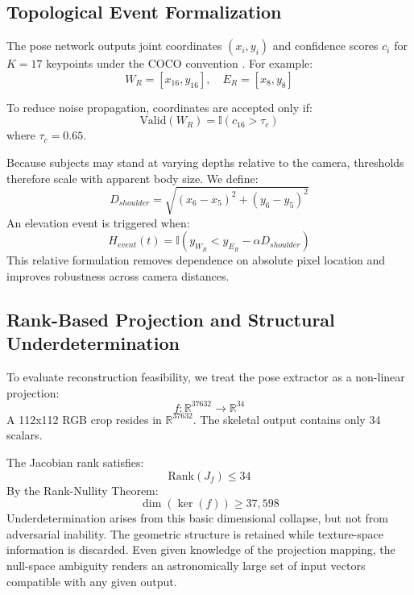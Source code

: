 \documentclass[conference]{IEEEtran}
\begin{document}
\subsection{Topological Event Formalization}
The pose network outputs joint coordinates $(x_i, y_i)$ and confidence scores $c_i$ for $K=17$ keypoints under the COCO convention \cite{b11}. For example:
\begin{equation}
W_R = [x_{16}, y_{16}], \quad E_R = [x_{8}, y_{8}]
\end{equation}

To reduce noise propagation, coordinates are accepted only if:
\begin{equation}
\text{Valid}(W_R) = \mathbb{I}(c_{16} > \tau_c)
\end{equation}
where $\tau_c = 0.65$.

Because subjects may stand at varying depths relative to the camera, thresholds therefore scale with apparent body size. We define:
\begin{equation}
D_{shoulder} = \sqrt{(x_6 - x_5)^2 + (y_6 - y_5)^2}
\end{equation}
An elevation event is triggered when:
\begin{equation}
H_{event}(t) = \mathbb{I}(y_{W_R} < y_{E_R} - \alpha D_{shoulder}) 
\end{equation}
This relative formulation removes dependence on absolute pixel location and improves robustness across camera distances.

\subsection{Rank-Based Projection and Structural Underdetermination}
To evaluate reconstruction feasibility, we treat the pose extractor as a non-linear projection:
\begin{equation}
f: \mathbb{R}^{37632} \rightarrow \mathbb{R}^{34}
\end{equation}
A 112x112 RGB crop resides in $\mathbb{R}^{37632}$. The skeletal output contains only 34 scalars.

The Jacobian rank satisfies:
\begin{equation}
\text{Rank}(J_f) \le 34
\end{equation}
By the Rank-Nullity Theorem:
\begin{equation}
\dim(\ker(f)) \ge 37,598
\end{equation}
Underdetermination arises from this basic dimensional collapse, but not from adversarial inability. The geometric structure is retained while texture-space information is discarded. Even given knowledge of the projection mapping, the null-space ambiguity renders an astronomically large set of input vectors compatible with any given output.
\end{document}
